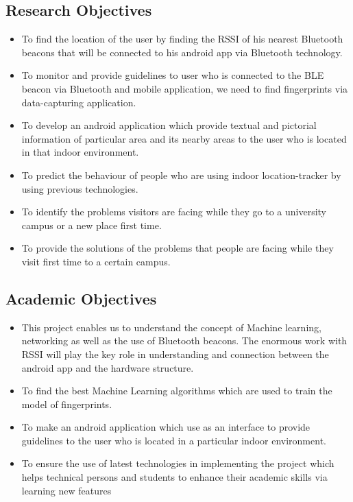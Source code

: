 \documentclass{article}
\begin{document}
\subsection{Research Objectives}
\begin{itemize}
\item To find the location of the user by finding the RSSI of his nearest Bluetooth beacons that will be connected to his android app via Bluetooth technology.
\item To monitor and provide guidelines to user who is connected to the BLE beacon via Bluetooth and mobile application, we need to find fingerprints via data-capturing application. 
\item To develop an android application which provide textual and pictorial information of particular area and its nearby areas to the user who is located in that indoor environment.
\item To predict the behaviour of people who are using indoor location-tracker by using previous technologies.
\item To identify the problems visitors are facing while they go to a university campus or a new place first time.
\item To provide the solutions of the problems that people are facing while they visit first time to a certain campus.


\end{itemize}
\subsection{Academic Objectives}
\begin{itemize}
\item This project enables us to understand the concept of Machine learning, networking as well as the use of Bluetooth beacons. The enormous work with RSSI will play the key role in understanding and connection between the android app and the hardware structure.
\item To find the best Machine Learning algorithms which are used to train the model of fingerprints. 
\item To make an android application which use as an interface to provide guidelines to the user who is located in a particular indoor environment.
\item To ensure the use of latest technologies in implementing the project which helps technical persons and students to enhance their academic skills via learning new features


\end{itemize}
\end{document}
